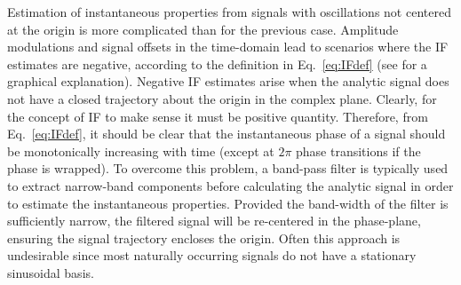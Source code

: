 \documentclass[a4paper]{IEEEtran}
\begin{document}
Estimation of instantaneous properties from signals with oscillations not centered at the origin is more complicated than for the previous case. Amplitude modulations and signal offsets in the time-domain lead to scenarios where the IF estimates are negative, according to the definition in Eq.~\ref{eq:IFdef} (see \cite{Huang1998} for a graphical explanation). Negative IF estimates arise when the analytic signal does not have a closed trajectory about the origin in the complex plane. Clearly, for the concept of IF to make sense it must be positive quantity. Therefore, from Eq.~\ref{eq:IFdef}, it should be clear that the instantaneous phase of a signal should be monotonically increasing with time (except at $2\pi$ phase transitions if the phase is wrapped). To overcome this problem, a band-pass filter is typically used to extract narrow-band components before calculating the analytic signal in order to estimate the instantaneous properties. Provided the band-width of the filter is sufficiently narrow, the filtered signal will be re-centered in the phase-plane, ensuring the signal trajectory encloses the origin. Often this approach is undesirable since most naturally occurring signals do not have a stationary sinusoidal basis. 

\end{document}
